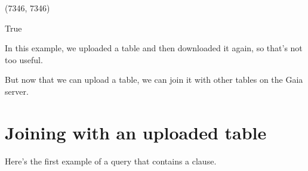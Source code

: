 \documentclass[letterpaper,10pt,english]{sphinxmanual}
\begin{document}
\begin{sphinxVerbatim}[commandchars=\\\{\}]
(7346, 7346)
\end{sphinxVerbatim}

\begin{sphinxVerbatim}[commandchars=\\\{\}]
\PYG{p}{[}\PYG{p}{]}  \PYG{p}{[}\PYG{p}{]}
\end{sphinxVerbatim}

\begin{sphinxVerbatim}[commandchars=\\\{\}]
True
\end{sphinxVerbatim}

In this example, we uploaded a table and then downloaded it again, so that’s not too useful.

But now that we can upload a table, we can join it with other tables on the Gaia server.


\section{Joining with an uploaded table}
\label{\detokenize{05_join:joining-with-an-uploaded-table}}
Here’s the first example of a query that contains a  clause.

\begin{sphinxVerbatim}[commandchars=\\\{\}]
  
\end{sphinxVerbatim}
\end{document}
